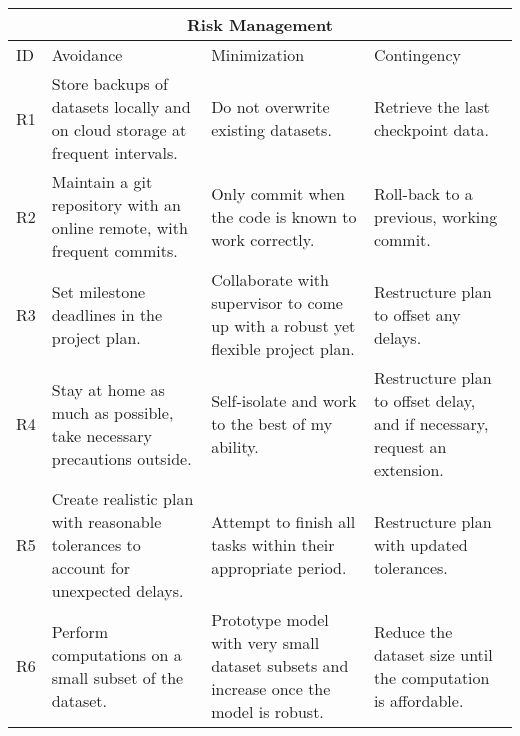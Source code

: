 \documentclass[a4paper,11pt]{article}
\begin{document}
\begin{longtable}[c]{|p{}|p{}|p{}|p{}|}
\hline
\multicolumn{4}{|c|}{Risk Management}                                                                                                                                                                                                                        \\ \hline

ID & Avoidance                                                                          & Minimization                                                                           & Contingency                                                               \\ \midrule
\endhead
R1 & Store backups of datasets locally and on cloud storage at frequent intervals.      & Do not overwrite existing datasets.                                                    & Retrieve the last checkpoint data.                                        \\ \midrule
R2 & Maintain a git repository with an online remote, with frequent commits.            & Only commit when the code is known to work correctly.                                  & Roll-back to a previous, working commit.                                  \\ \midrule
R3 & Set milestone deadlines in the project plan.                                       & Collaborate with supervisor to come up with a robust yet flexible project plan.        & Restructure plan to offset any delays.                                    \\ \midrule
R4 & Stay at home as much as possible, take necessary precautions outside.              & Self-isolate and work to the best of my ability.                                       & Restructure plan to offset delay, and if necessary, request an extension. \\ \midrule
R5 & Create realistic plan with reasonable tolerances to account for unexpected delays. & Attempt to finish all tasks within their appropriate period.                           & Restructure plan with updated tolerances.                                 \\ \midrule
R6 & Perform computations on a small subset of the dataset.                             & Prototype model with very small dataset subsets and increase once the model is robust. & Reduce the dataset size until the computation is affordable.              \\ \bottomrule
\end{longtable}
\end{document}
